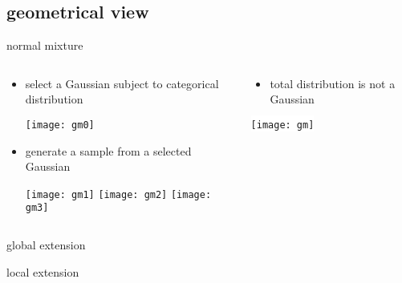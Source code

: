 \documentclass[fleqn,aspectratio=1610]{beamer}
\begin{document}
\subsection{geometrical view}
\label{sec:orga47f139}
\begin{frame}[label={sec:org3afc8ef}]{normal mixture}
\begin{columns}
\begin{column}{0.5\columnwidth}
\begin{itemize}
\item select a Gaussian subject to categorical distribution
\begin{center}
\texttt{[image: gm0]}
\end{center}
\item generate a sample from a selected Gaussian
\begin{center}
\texttt{[image: gm1]}
\texttt{[image: gm2]}
\texttt{[image: gm3]}
\end{center}
\end{itemize}
\end{column}
\begin{column}{0.5\columnwidth}
\begin{itemize}
\item total distribution is not a Gaussian
\end{itemize}
\begin{center}
\colorbox{white}{
  \texttt{[image: gm]}
}
\end{center}
\end{column}
\end{columns}
\end{frame}

\begin{frame}[label={sec:org7e567ef}]{global extension}
\begin{center}
\end{center}
\end{frame}

\begin{frame}[label={sec:org8166961}]{local extension}
\begin{center}
\end{center}
\end{frame}
\end{document}
